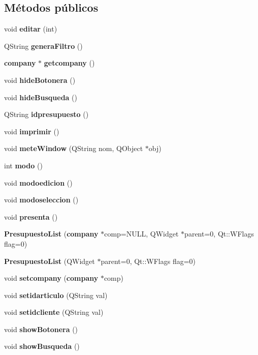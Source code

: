 \subsection*{M\'{e}todos p\'{u}blicos}
\begin{CompactItemize}
\item 
void {\bf editar} (int)\label{classPresupuestoList_a0}

\item 
QString {\bf genera\-Filtro} ()
\item 
{\bf company} $\ast$ {\bf getcompany} ()\label{classPresupuestoList_a2}

\item 
void {\bf hide\-Botonera} ()\label{classPresupuestoList_a3}

\item 
void {\bf hide\-Busqueda} ()\label{classPresupuestoList_a4}

\item 
QString {\bf idpresupuesto} ()\label{classPresupuestoList_a5}

\item 
void {\bf imprimir} ()\label{classPresupuestoList_a6}

\item 
void {\bf mete\-Window} (QString nom, QObject $\ast$obj)\label{classPresupuestoList_a7}

\item 
int {\bf modo} ()\label{classPresupuestoList_a8}

\item 
void {\bf modoedicion} ()\label{classPresupuestoList_a9}

\item 
void {\bf modoseleccion} ()\label{classPresupuestoList_a10}

\item 
void {\bf presenta} ()
\item 
{\bf Presupuesto\-List} ({\bf company} $\ast$comp=NULL, QWidget $\ast$parent=0, Qt::WFlags flag=0)\label{classPresupuestoList_a12}

\item 
{\bf Presupuesto\-List} (QWidget $\ast$parent=0, Qt::WFlags flag=0)\label{classPresupuestoList_a13}

\item 
void {\bf setcompany} ({\bf company} $\ast$comp)\label{classPresupuestoList_a14}

\item 
void {\bf setidarticulo} (QString val)\label{classPresupuestoList_a15}

\item 
void {\bf setidcliente} (QString val)\label{classPresupuestoList_a16}

\item 
void {\bf show\-Botonera} ()\label{classPresupuestoList_a17}

\item 
void {\bf show\-Busqueda} ()\label{classPresupuestoList_a18}

\end{CompactItemize}


